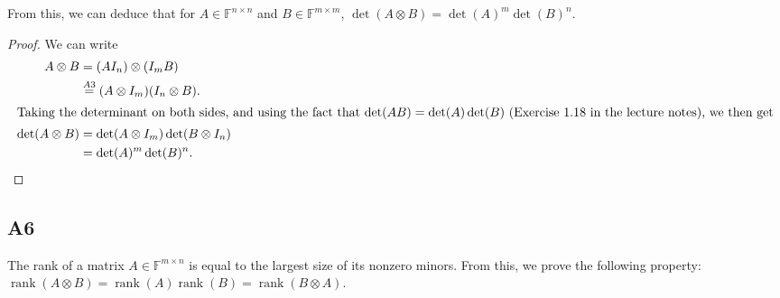 \documentclass[11pt]{article}
\DeclareMathOperator{\rank}{rank}
\newcommand{\field}{\mathbb{F}} %
\newcommand{\kp}{\otimes} %
\begin{document}
From this, we can deduce that for \(A \in \field^{n \times n}\) and \(B \in \field^{m \times m}\), \(\det(A \kp B) = \det(A)^m \det(B)^n\).
\begin{proof}
	We can write
	\begin{align*}
	A \kp B &= (A I_n) \kp (I_m B)\\
	&\overset{A3}{=} (A \kp I_m) (I_n \kp B).\\
	\intertext{Taking the determinant on both sides, and using the fact that 
		\(\det(AB) = \det(A)\det(B)\) (Exercise~1.18 in the lecture notes), we then get}
	\det(A \kp B) &= \det(A \kp I_m) \det(B \kp I_n)\\
	&= \det(A)^m \det(B)^n.\qedhere
	\end{align*}
\end{proof}

\subsection*{A6}
The rank of a matrix \(A \in \field^{m \times n}\) is equal to the largest size of its nonzero minors.
From this, we prove the following property: $\rank(A\kp B)=\rank(A)\rank(B)=\rank(B\kp A)$.
\end{document}
